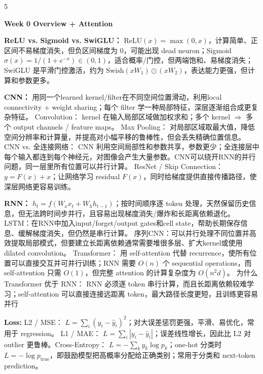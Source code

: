 \documentclass[a4paper, landscape]{article}
\newcommand{\topic}[1]{\par\medskip\textbf{#1}\par}
\renewcommand{\topic}[1]{%
  \par\smallskip\noindent
  \colorbox{highlightcolor}{%
    \parbox{\dimexpr\columnwidth-2\fboxsep\relax}{%
      \textbf{#1}%
    }%
  }%
  \par
}
\begin{document}
\pagestyle{empty}

\fontsize{4}{5}\selectfont

\begin{multicols}{5}


\topic{Week 0 Overview + Attention}
\par \textbf{ReLU vs. Sigmoid vs. SwiGLU：} \(\mathrm{ReLU}(x)=\max(0,x)\)，计算简单、正区间不易梯度消失，但负区间梯度为 0，可能出现 dead neuron；Sigmoid \(\sigma(x)=1/(1+e^{-x})\in(0,1)\)，适合概率/门控，但两端饱和、易梯度消失；SwiGLU 是平滑门控激活，约为 \(\mathrm{Swish}(xW_1)\odot(xW_2)\)，表达能力更强，但计算和参数更多。
\par \textbf{CNN：} 用同一个learned kernel/filter在不同空间位置滑动，利用local connectivity + weight sharing；每个 filter 学一种局部特征，深层逐渐组合成更复杂特征。
Convolution： kernel 在输入局部区域做加权求和；多个 kernel \(\Rightarrow\) 多个 output channels / feature maps。
Max Pooling： 对局部区域取最大值，降低空间分辨率和计算量，并提高对小幅平移的鲁棒性，但会丢失精确位置信息。
CNN vs. 全连接网络： CNN 利用空间局部性和参数共享，参数更少；全连接层中每个输入都连到每个神经元，对图像会产生大量参数。CNN可以绕开RNN的并行问题，同一层里所有位置可以并行计算。
ResNet / Skip Connection： \(y=F(x)+x\)；让网络学习 residual \(F(x)\)，同时给梯度提供直接传播路径，使深层网络更容易训练。
\par \textbf{RNN：} \(h_t=f(W_xx_t+W_hh_{t-1})\)；按时间顺序逐 token 处理，天然保留历史信息，但无法跨时间步并行，且容易出现梯度消失/爆炸和长距离依赖退化。
LSTM：在RNN中加入input/forget/output gates和cell state，帮助长期保存信息、缓解梯度消失，但仍然是串行计算。
序列CNN：可以并行处理不同位置并高效提取局部模式，但要建立长距离依赖通常需要堆很多层、扩大kernel或使用dilated convolution。
Transformer： 用 self-attention 代替 recurrence，使所有位置可以直接交互并可并行训练；RNN 需要 \(O(n)\) 个 sequential operations，而 self-attention 只需 \(O(1)\)，但完整 attention 的计算复杂度为 \(O(n^2d)\)。
为什么 Transformer 优于 RNN： RNN 必须逐 token 串行计算，而且长距离依赖较难学习；self-attention 可以直接连接远距离 token，最大路径长度更短，且训练更容易并行
\par \textbf{Loss:} L2 / MSE： \(L=\sum_i(y_i-\hat y_i)^2\)；对大误差惩罚更强，平滑、易优化，常用于 regression。
L1 / MAE： \(L=\sum_i|y_i-\hat y_i|\)；误差线性增长，因此比 L2 对 outlier 更鲁棒。Cross-Entropy： \(L=-\sum_k y_k\log p_k\)；one-hot 分类时 \(L=-\log p_{\text{true}}\)，即鼓励模型把高概率分配给正确类别；常用于分类和 next-token prediction。

\end{multicols}
\end{document}
